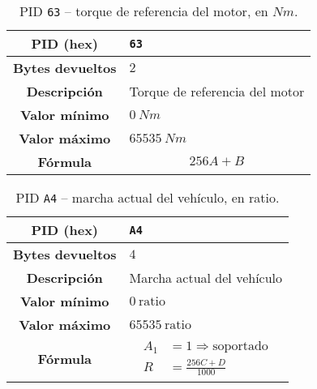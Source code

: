 \begin{table}[H]
  \centering
  \begin{tabularx}{\textwidth}{|c|X|}
    \hline
    \textbf{PID (hex)}       & \texttt{63}                    \\
    \hline
    \textbf{Bytes devueltos} & $2$                            \\
    \hline
    \textbf{Descripción}     & Torque de referencia del motor \\
    \hline
    \textbf{Valor mínimo}    & $0~Nm$                  \\
    \hline
    \textbf{Valor máximo}    & $65535~Nm$              \\
    \hline
    \textbf{Fórmula}         &                                %
    \begin{equation*}
      256A + B
    \end{equation*}                                \\
    \hline
  \end{tabularx}
  \caption{\ac{PID} \texttt{63} -- torque de referencia del motor, en $Nm$.}
\end{table}

\begin{table}[H]
  \centering
  \begin{tabularx}{\textwidth}{|c|X|}
    \hline
    \textbf{PID (hex)}       & \texttt{A4}                \\
    \hline
    \textbf{Bytes devueltos} & $4$                        \\
    \hline
    \textbf{Descripción}     & Marcha actual del vehículo \\
    \hline
    \textbf{Valor mínimo}    & $0~\text{ratio}$           \\
    \hline
    \textbf{Valor máximo}    & $65535~\text{ratio}$       \\
    \hline
    \textbf{Fórmula}         &                            %
    \begin{equation*}
      \begin{aligned}
        A_1 & = 1 \Longrightarrow \text{soportado} \\
        R   & = \frac{256C + D}{1000}
      \end{aligned}
    \end{equation*}                            \\
    \hline
  \end{tabularx}
  \caption{\ac{PID} \texttt{A4} -- marcha actual del vehículo, en ratio.}
\end{table}

